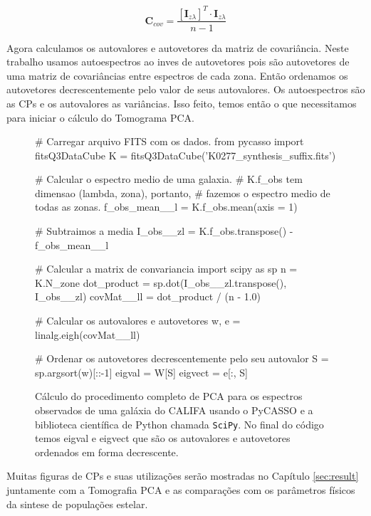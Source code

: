 \begin{equation}
	\label{eq:PCA:covMatrix}
	\mathbf{C}{}_{cov} = \frac{[\mathbf{I}{}_{z \lambda}]^T \cdot \mathbf{I}{}_{z
	\lambda}}{n - 1}
\end{equation}

Agora calculamos os autovalores e autovetores da matriz de covariância. Neste
trabalho usamos autoespectros ao inves de autovetores pois são autovetores de
uma matriz de covariâncias entre espectros de cada zona. Então ordenamos os
autovetores decrescentemente pelo valor de seus autovalores. Os autoespectros
são as CPs e os autovalores as variâncias. Isso feito, temos então o que
necessitamos para iniciar o cálculo do Tomograma PCA.

\begin{figure}
\begin{python}
# Carregar arquivo FITS com os dados.
from pycasso import fitsQ3DataCube
K = fitsQ3DataCube('K0277_synthesis_suffix.fits')

# Calcular o espectro medio de uma galaxia. 
# K.f_obs tem dimensao (lambda, zona), portanto, 
# fazemos o espectro medio de todas as zonas.
f_obs_mean__l = K.f_obs.mean(axis = 1)

# Subtraimos a media
I_obs__zl = K.f_obs.transpose() - f_obs_mean__l

# Calcular a matrix de convariancia
import scipy as sp
n = K.N_zone
dot_product = sp.dot(I_obs__zl.transpose(), I_obs__zl)
covMat__ll = dot_product / (n - 1.0)   

# Calcular os autovalores e autovetores
w, e = linalg.eigh(covMat__ll)

# Ordenar os autovetores decrescentemente pelo seu autovalor
S = sp.argsort(w)[::-1]
eigval = W[S]
eigvect = e[:, S]
 
\end{python}
	\caption[Exemplo de cálculo de PCA usando o PyCASSO e SciPy] {Cálculo do
	procedimento completo de PCA para os espectros observados de uma galáxia do
	CALIFA usando o PyCASSO e a biblioteca científica de Python chamada
	\texttt{SciPy}. No final do código temos eigval e eigvect que são os
	autovalores e autovetores ordenados em forma decrescente.}
	\label{fig:PCA:covMatrix}
\end{figure}

Muitas figuras de CPs e suas utilizações serão mostradas no Capítulo
\ref{sec:result} juntamente com a Tomografia PCA e as comparações com os
parâmetros físicos da sintese de populações estelar.


